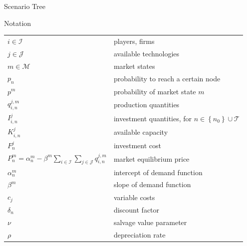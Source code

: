 \begin{frame}{Scenario Tree}
\begin{center}
{
\endpsmatrix}
\end{center}
\end{frame}

\begin{frame}{Notation}
  \begin{tabular}[l]{l l}
\centering
$i \in \mathcal{I}$ & players, firms \\
$j \in \mathcal{J}$ & available technologies \\
$m\in\mathcal{M}$ & market states \\
$p_n$ & probability to reach a certain node\\
$p^m$ & probability of market state $m$ \\
$ q_{i,n}^{j,m}$ & production quantities \\
$I_{i,n}^{j}$ & investment quantities, for $n\in\left\{n_0\right\}\cup\mathcal{T}$ \\
$K_{i,n}^{j}$ & available capacity\\
$F_n^{j}$ & investment cost\\
$P^m_n = \alpha_n^m-\beta^m\sum_{i\in \mathcal{I}}\sum_{j\in \mathcal{J}}q_{i,n}^{j,m}$ & market equilibrium price \\
$\alpha_n^m$ & intercept of demand function \\
$\beta^m$ & slope of demand function \\
$c_j$ & variable costs \\
$\delta_n$ & discount factor \\
$\nu$ & salvage value parameter\\
$\rho$ & depreciation rate\\
\end{tabular}
\end{frame}

